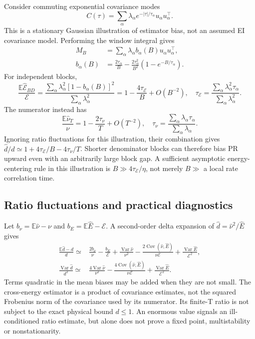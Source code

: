 Consider commuting exponential covariance modes
\[
 C(\tau)=\sum_\alpha\lambda_\alpha
    e^{-|\tau|/\tau_\alpha}u_\alpha u_\alpha^\top.
\]
This is a stationary Gaussian illustration of estimator bias, not an assumed
EI covariance model. Performing the window integral gives
\begin{align*}
 M_B&=\sum_\alpha\lambda_\alpha b_\alpha(B)
               u_\alpha u_\alpha^\top,\\
 b_\alpha(B)&=\frac{2\tau_\alpha}{B}
       -\frac{2\tau_\alpha^2}{B^2}
          (1-e^{-B/\tau_\alpha}).
\end{align*}
For independent blocks,
\[
 \frac{\mathbb E\widehat{\mathcal E}_{BD}}{\mathcal E}
 =\frac{\sum_\alpha\lambda_\alpha^2[1-b_\alpha(B)]^2}
        {\sum_\alpha\lambda_\alpha^2}
 =1-\frac{4\tau_{\mathcal E}}B+O(B^{-2}),\quad
 \tau_{\mathcal E}=\frac{\sum_\alpha\lambda_\alpha^2\tau_\alpha}
                        {\sum_\alpha\lambda_\alpha^2}.
\]
The numerator instead has
\[
 \frac{\mathbb E\widehat\nu_T}{\nu}
 =1-\frac{2\tau_\nu}{T}+O(T^{-2}),\quad
 \tau_\nu=\frac{\sum_\alpha\lambda_\alpha\tau_\alpha}
                   {\sum_\alpha\lambda_\alpha}.
\]
Ignoring ratio fluctuations for this illustration, their combination gives
$\widehat d/d\simeq1+4\tau_{\mathcal E}/B-4\tau_\nu/T$. Shorter denominator
blocks can therefore bias PR upward even with an arbitrarily large block gap.
A sufficient asymptotic energy-centering rule in this illustration is
$B\gg4\tau_{\mathcal E}/\eta$, not merely $B\gg$ a local rate correlation time.

\subsection{Ratio fluctuations and practical diagnostics}
Let $b_\nu=\mathbb E\widehat\nu-\nu$ and
$b_E=\mathbb E\widehat E-\mathcal E$. A second-order delta expansion of
$\widehat d=\widehat\nu^2/\widehat E$ gives
\begin{align*}
 \frac{\mathbb E\widehat d-d}{d}
 \simeq{}&\frac{2b_\nu}{\nu}-\frac{b_E}{\mathcal E}
  +\frac{\operatorname{Var}\widehat\nu}{\nu^2}
  -\frac{2\operatorname{Cov}(\widehat\nu,\widehat E)}{\nu\mathcal E}
  +\frac{\operatorname{Var}\widehat E}{\mathcal E^2},\\
 \frac{\operatorname{Var}\widehat d}{d^2}
 \simeq{}&\frac{4\operatorname{Var}\widehat\nu}{\nu^2}
  -\frac{4\operatorname{Cov}(\widehat\nu,\widehat E)}{\nu\mathcal E}
  +\frac{\operatorname{Var}\widehat E}{\mathcal E^2}.
\end{align*}
Terms quadratic in the mean biases may be added when they are not small.
The cross-energy estimator is a product of covariance estimates, not the
squared Frobenius norm of the covariance used by its numerator. Its finite-T
ratio is not subject to the exact physical bound $d\le1$. An enormous value
signals an ill-conditioned ratio estimate, but alone does not prove a fixed
point, multistability or nonstationarity.

